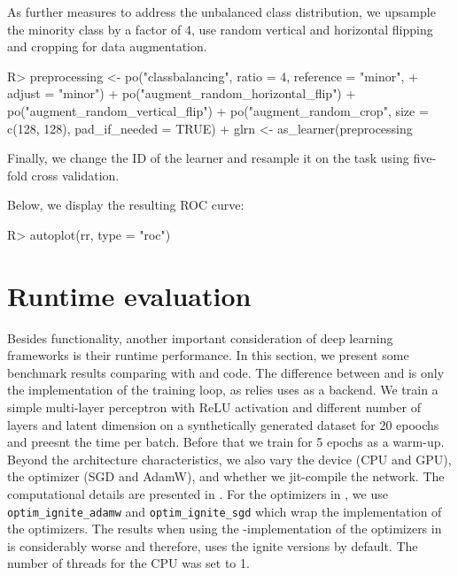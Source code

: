 \documentclass[article]{jss}
\theoremstyle{definition}
\begin{document}
As further measures to address the unbalanced class distribution, we upsample the minority class by a factor of 4, use random vertical and horizontal flipping and cropping for data augmentation.

\begin{CodeInput}
R> preprocessing <- po("classbalancing", ratio = 4, reference = "minor",
+      adjust = "minor") %
+    po("augment_random_horizontal_flip") %
+    po("augment_random_vertical_flip") %
+    po("augment_random_crop", size = c(128, 128), pad_if_needed = TRUE)
+  glrn <- as_learner(preprocessing %
\end{CodeInput}

Finally, we change the ID of the learner and resample it on the task using five-fold cross validation.


Below, we display the resulting ROC curve:

\begin{CodeInput}
R> autoplot(rr, type = "roc")
\end{CodeInput}


\section{Runtime evaluation}\label{sec:benchmarks}

Besides functionality, another important consideration of deep learning frameworks is their runtime performance.
In this section, we present some benchmark results comparing \mlrttorch{} with \torch{} and \pytorch{} code.
The difference between \mlrttorch{} and \torch{} is only the implementation of the training loop, as \mlrttorch{} relies uses \torch{} as a backend.
We train a simple multi-layer perceptron with ReLU activation and different number of layers and latent dimension on a synthetically generated dataset for 20 epoochs and preesnt the time per batch.
Before that we train for 5 epochs as a warm-up.
Beyond the architecture characteristics, we also vary the device (CPU and GPU), the optimizer (SGD and AdamW), and whether we jit-compile the network.
The computational details are presented in .
For the optimizers in \rlang{}, we use \texttt{optim\_ignite\_adamw} and \texttt{optim\_ignite\_sgd} which wrap the \libtorch{} implementation of the optimizers.
The results when using the \rlang{}-implementation of the optimizers in \torch{} is considerably worse and therefore, \mlrttorch{} uses the ignite versions by default.
The number of threads for the CPU was set to 1.
\end{document}
